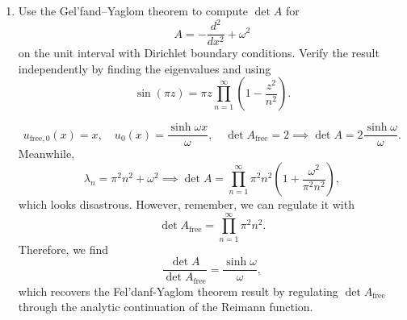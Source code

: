\begin{enumerate}[label=\alph*)]
    \item Use the Gel'fand--Yaglom theorem to compute $\det A$ for
    \begin{equation}
        A=-\frac{d^2}{dx^2}+\omega^2
    \end{equation}
    on the unit interval with Dirichlet boundary conditions. Verify the result
    independently by finding the eigenvalues and using
    \begin{equation}
        \sin(\pi z)
        =\pi z\prod_{n=1}^{\infty}
        \left(1-\frac{z^2}{n^2}\right).
    \end{equation}
    \begin{solution}
        \begin{equation}
            u_{\mathrm{free},0}(x) = x, \quad u_0(x) = \frac{\sinh \omega x}{\omega}, \quad \det A_\mathrm{free} = 2 \implies \det A =2\frac{\sinh \omega}{\omega}.
        \end{equation}
        Meanwhile,
        \begin{equation}
            \lambda_n =  \pi^2n^2 + \omega^2 \implies \det A = \prod_{n=1}^\infty \pi^2n^2\left(1 +\frac{\omega^2}{\pi^2 n^2}\right),
        \end{equation}
        which looks disastrous. However, remember, we can regulate it with
        \begin{equation}
            \det A_\mathrm{free} = \prod_{n=1}^\infty \pi^2n^2.
        \end{equation}
        Therefore, we find
        \begin{equation}
            \frac{\det A}{\det A_\mathrm{free}}  =\frac{\sinh \omega}{\omega},
        \end{equation}
        which recovers the Fel'danf-Yaglom theorem result by regulating $\det A_\mathrm{free}$ through the analytic continuation of the Reimann function.
    \end{solution}
\end{enumerate}
